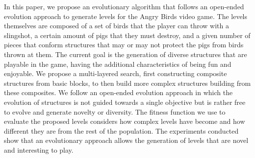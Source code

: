In this paper, we propose an evolutionary algorithm that follows an open-ended
evolution approach to generate levels for the Angry Birds video game. The levels
themselves are composed of a set of birds that the player can throw with a
slingshot, a certain amount of pigs that they must destroy, and a given number
of pieces that conform structures that may or may not protect the pigs from
birds thrown at them. The current goal is the generation of diverse structures
that are playable in the game, having the additional characteristics of being
fun and enjoyable. We propose a multi-layered search, first constructing
composite structures from basic blocks, to then build more complex structures
building from these composites. We follow an open-ended evolution approach in
which the evolution of structures is not guided towards a single objective but
is rather free to evolve and generate novelty or diversity. The fitness function
we use to evaluate the proposed levels considers how complex levels have become
and how different they are from the rest of the population. The experiments
conducted show that an evolutionary approach allows the generation of levels
that are novel and interesting to play.